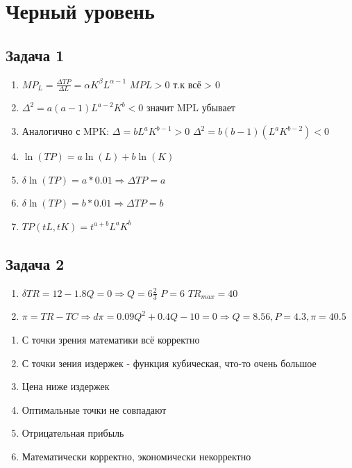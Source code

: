 \documentclass[a4paper,12pt]{article}
\begin{document}
\section{Черный уровень}
\subsection{Задача 1}
\begin{enumerate}
    \item $MP_L = \frac{\Delta TP}{\Delta L} = \alpha K^{\beta}L^{\alpha - 1}$ $MPL > 0 $ т.к всё > 0
    \item $\Delta^2 = a(a-1)L^{a-2}K^b<0$ значит MPL убывает
    \item Аналогично с MPK: $\Delta = bL^aK^{b-1}>0$ $\Delta^2 = b(b-1)(L^aK^{b-2})<0$
    \item $\ln(TP)=a\ln(L)+b\ln(K)$
    \item $\delta \ln(TP) = a*0.01 \Rightarrow \Delta TP = a$
    \item $\delta \ln(TP) = b*0.01 \Rightarrow \Delta TP = b$
    \item $TP(tL, tK)=t^{a+b}L^aK^b$
\end{enumerate}

\subsection{Задача 2}
\begin{enumerate}
    \item $\delta TR = 12-1.8Q=0 \Rightarrow Q = 6\frac{2}{3}$ $P=6$ $TR_{max} = 40$
    \item $\pi = TR-TC \Rightarrow d\pi = 0.09Q^2+0.4Q-10=0 \Rightarrow Q = 8.56, P=4.3, \pi = 40.5$
\end{enumerate}


\begin{enumerate}
    \item С точки зрения математики всё корректно
    \item С точки зения издержек - функция кубическая, что-то очень большое
    \item Цена ниже издержек
    \item Оптимальные точки не совпадают
    \item Отрицательная прибыль
    \item Математически корректно, экономически некорректно
\end{enumerate}
\end{document}
